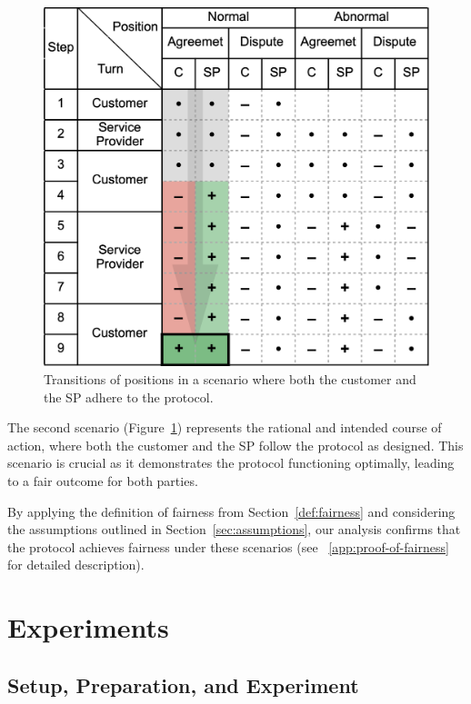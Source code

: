 \documentclass[pdftex,twocolumn,epjc3]{svjour3}
\begin{document}
{\begin{figure}[h!]
\includegraphics[width=\linewidth]{rational.png}
\centering
\caption{Transitions of positions in a scenario where both the customer and the SP adhere to the protocol.}
\label{fig:rational}
\end{figure}

The second scenario (Figure~\ref{fig:rational}) represents the rational and intended course of action, where both the customer and the SP follow the protocol as designed. This scenario is crucial as it demonstrates the protocol functioning optimally, leading to a fair outcome for both parties.

By applying the definition of fairness from Section~\ref{def:fairness} and considering the assumptions outlined in Section~\ref{sec:assumptions}, our analysis confirms that the protocol achieves fairness under these scenarios (see ~\ref{app:proof-of-fairness} for detailed description).

\section{Experiments}\label{sec:experiments}

\subsection*{Setup, Preparation, and Experiment}

}
\end{document}
